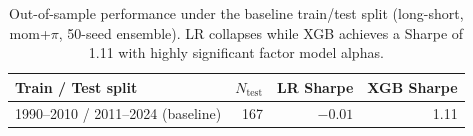 \begin{table}[H]
\centering
\small
\begin{tabular}{l r r r}
\toprule
Train / Test split & $N_{\text{test}}$ & LR Sharpe & XGB Sharpe \\
\midrule
1990--2010 / 2011--2024 (baseline) & 167 & $-0.01$ & 1.11 \\
\bottomrule
\end{tabular}
\caption{Out-of-sample performance under the baseline train/test split (long-short, mom+$\pi$, 50-seed ensemble). LR collapses while XGB achieves a Sharpe of 1.11 with highly significant factor model alphas.}
\label{tab:alt_splits}
\end{table}